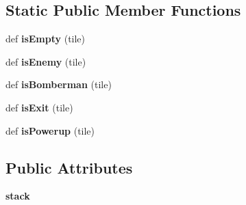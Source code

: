 \subsection*{Static Public Member Functions}
\begin{DoxyCompactItemize}
\item 
\hypertarget{classsrc_1_1tile_1_1_tile_a402644908c005daf8f452078a8498884}{}def {\bfseries is\+Empty} (tile)\label{classsrc_1_1tile_1_1_tile_a402644908c005daf8f452078a8498884}

\item 
\hypertarget{classsrc_1_1tile_1_1_tile_a26d5b3272e8b49c400420bfb80f2367e}{}def {\bfseries is\+Enemy} (tile)\label{classsrc_1_1tile_1_1_tile_a26d5b3272e8b49c400420bfb80f2367e}

\item 
\hypertarget{classsrc_1_1tile_1_1_tile_abe6a8c872f4e0d314bedb157c5d05f88}{}def {\bfseries is\+Bomberman} (tile)\label{classsrc_1_1tile_1_1_tile_abe6a8c872f4e0d314bedb157c5d05f88}

\item 
\hypertarget{classsrc_1_1tile_1_1_tile_a81e3ba4c45f3defa624c6d5cd080dab6}{}def {\bfseries is\+Exit} (tile)\label{classsrc_1_1tile_1_1_tile_a81e3ba4c45f3defa624c6d5cd080dab6}

\item 
\hypertarget{classsrc_1_1tile_1_1_tile_a464b874776619a4388f7bc8a5a57eee1}{}def {\bfseries is\+Powerup} (tile)\label{classsrc_1_1tile_1_1_tile_a464b874776619a4388f7bc8a5a57eee1}

\end{DoxyCompactItemize}
\subsection*{Public Attributes}
\begin{DoxyCompactItemize}
\item 
\hypertarget{classsrc_1_1tile_1_1_tile_aaad193d1f0e1a1e90570e6069f65b330}{}{\bfseries stack}\label{classsrc_1_1tile_1_1_tile_aaad193d1f0e1a1e90570e6069f65b330}

\end{DoxyCompactItemize}
